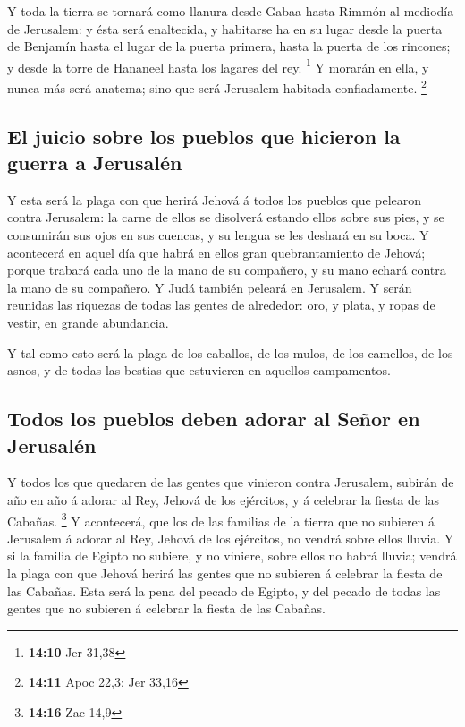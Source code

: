  Y toda la tierra se tornará como llanura desde Gabaa
hasta Rimmón al mediodía de Jerusalem: y ésta será enaltecida, y
habitarse ha en su lugar desde la puerta de Benjamín hasta el lugar de
la puerta primera, hasta la puerta de los rincones; y desde la torre de
Hananeel hasta los lagares del rey. \footnote{\textbf{14:10} Jer 31,38}
 Y morarán en ella, y nunca más será anatema; sino que
será Jerusalem habitada confiadamente. \footnote{\textbf{14:11} Apoc
  22,3; Jer 33,16}

\hypertarget{el-juicio-sobre-los-pueblos-que-hicieron-la-guerra-a-jerusaluxe9n}{%
\subsection{El juicio sobre los pueblos que hicieron la guerra a
Jerusalén}\label{el-juicio-sobre-los-pueblos-que-hicieron-la-guerra-a-jerusaluxe9n}}

 Y esta será la plaga con que herirá Jehová á todos los
pueblos que pelearon contra Jerusalem: la carne de ellos se disolverá
estando ellos sobre sus pies, y se consumirán sus ojos en sus cuencas, y
su lengua se les deshará en su boca.  Y acontecerá en
aquel día que habrá en ellos gran quebrantamiento de Jehová; porque
trabará cada uno de la mano de su compañero, y su mano echará contra la
mano de su compañero.  Y Judá también peleará en
Jerusalem. Y serán reunidas las riquezas de todas las gentes de
alrededor: oro, y plata, y ropas de vestir, en grande abundancia.

 Y tal como esto será la plaga de los caballos, de los
mulos, de los camellos, de los asnos, y de todas las bestias que
estuvieren en aquellos campamentos.

\hypertarget{todos-los-pueblos-deben-adorar-al-seuxf1or-en-jerusaluxe9n}{%
\subsection{Todos los pueblos deben adorar al Señor en
Jerusalén}\label{todos-los-pueblos-deben-adorar-al-seuxf1or-en-jerusaluxe9n}}

 Y todos los que quedaren de las gentes que vinieron
contra Jerusalem, subirán de año en año á adorar al Rey, Jehová de los
ejércitos, y á celebrar la fiesta de las Cabañas. \footnote{\textbf{14:16}
  Zac 14,9}  Y acontecerá, que los de las familias de la
tierra que no subieren á Jerusalem á adorar al Rey, Jehová de los
ejércitos, no vendrá sobre ellos lluvia.  Y si la familia
de Egipto no subiere, y no viniere, sobre ellos no habrá lluvia; vendrá
la plaga con que Jehová herirá las gentes que no subieren á celebrar la
fiesta de las Cabañas.  Esta será la pena del pecado de
Egipto, y del pecado de todas las gentes que no subieren á celebrar la
fiesta de las Cabañas.

